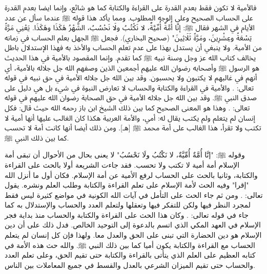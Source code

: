 فالأمية لا تكون فقط بعدم القدرة على القراءة والكتابة كما هو شائع، وإنما ايضا بعدم القدرة على الحساب الصحيح وعلى الوجه المطلوب. ومما يأكد هذا قوله ﷺ عندما سأل عن عدد الأيام في الشهر فقال ﷺ: إنَّا أُمَّةٌ أُمِّيَّةٌ، لا نَكْتُبُ ولَا نَحْسُبُ، الشَّهْرُ هَكَذَا وهَكَذَا. يَعْنِي مَرَّةً تِسْعَةً وعِشْرِينَ، ومَرَّةً ثَلَاثِينَ" {\footnotesize (صحيح البخاري)}. فجعل ﷺ الجهل بعلم الحساب في زمانه من الأمية. ولا ينبغي أن يستدل بهذا على عدم تعلم الحساب والأخذ به فهذا الإستدلال باطل يخالف كتاب الله عز وجل وسنة نبيه ﷺ كما تقدم. وإنما المقصود بالأمية في هذا الحديث هو الرسول ﷺ وأصحابه رضوان الله عليهم أجمعين الذين وصفهم الله جل جلاله بالأمية، أي أنهم في غالبهم لا يكتبون ولا يحسبون. وقد بين الله جل جلاله الأمية في حق نبيه في قوله تعالى: \quranayah*[7][158][21]{\footnotesize \surahname*[7]}. والأمية في القراءة والكتابة والحساب لا تعارض النبوة في شيء بل هي دليل على صدق النبي ﷺ. وقد بين الله جل جلاله الأمية في حق الصحابة رضوان الله عليهم في قوله تعالى: \quranayah*[62][2]{\footnotesize \surahname*[62]}. وهذا هو المعنى الصحيح كما بين ذلك الشيخ ابن باز رحمه الله حيث قال: فكل إنسان لم يتعلم ولم يكتب يقال له: أمي، والأمة العربية هكذا كان الغالب عليها أنها أمية لا تكتب ولا تقرأ، هذا الغالب على أمة محمد ﷺ [هـ]. ومن ذلك أيضا أنها كانت أمة لا تحسب كما بين ذلك النبي ﷺ.

وقوله ﷺ: "إنَّا أُمَّةٌ أُمِّيَّةٌ، لا نَكْتُبُ ولَا نَحْسُبُ" لا يعنى بحال من الأحوال أن تبقى أمة الإسلام أمة أمية لا تكتب ولا تحسب.  فقد جاءت الشريعة أولا بالحث على القراءة والكتابة، وثانيا بالحث على الحساب لرفع الأمية عن أمة الإسلام. فكان أول ما أنزل الله "إقرا" وفيه الحث لأمة الإسلام على تعلم القراءة والكتابة وطلب العلم ونشره. يقول تعالى:
\quranayah*[96][1-5]{\footnotesize \surahname*[96]}.
ومن ثم جاء الحث على التأمل في آيات الله الكونية في مواضع كثيرة ليس فقط لمجرد النظر فيها ولكن للتفكر فيها وتعقلها ولتعلم العدد والحساب والإستدلال به كما جاء في قوله تعالى: \quranayah*[10][5]{\footnotesize \surahname*[10]}. وكان هذا الحث على القراءة والكتابة والحساب منذ بداية فجر الإسلام في العهد المكي الذي اتسم بالدعوة إلى التوحيد الخالص. فدل ذلك على أن دين الإسلام هو دين الحضارة التي تبنى على الحق والعدل معا. ولهذا فإن كل إنسان لم يتعلم الحساب مع القراءة والكتابة يكون أميا كما بين ذلك النبي ﷺ. والله حث هذه الأمة في كتابه العظيم على العلم الذي يتأتى بالقراءة والكتابة حتى تقيم الحق، وعلى تعلم العدد والحساب حتى تقيم الميزان الشرعي بالعدل والقسط في جميع المعاملات بين الناس. 

